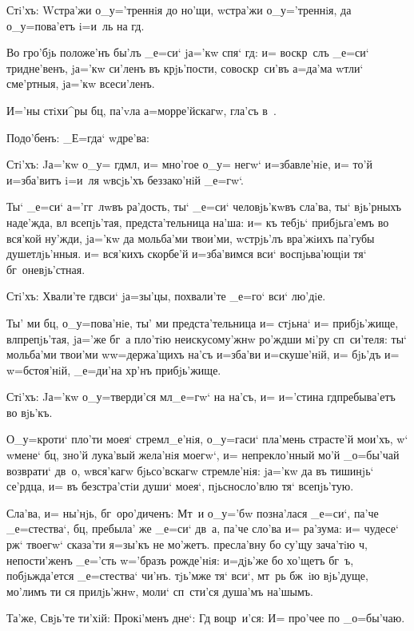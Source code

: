 Стi'хъ: W\т стра'жи о_у='треннiя до но'щи, w\т стра'жи 
о_у='треннiя, да о_у=пова'етъ i=и~ль на гд.

Во гро'бjь положе'нъ бы'лъ _е=си` jа='кw спя` гд: 
и= воскр~слъ _е=си` тридне'венъ, jа='кw си'ленъ въ 
крjь'пости, совоскр~си'въ а=да'ма w\т тли` сме'ртныя, 
jа='кw всеси'ленъ.

И='ны стiхи^ры бц, па'vла а=морре'йскагw, гла'съ 
в~.

Подо'бенъ: _Е=гда` w\т дре'ва:

Стi'хъ: Jа='кw о_у= гд мл, и= мно'гое о_у= 
негw` и=збавле'нiе, и= то'й и=зба'витъ i=и~ля w\т всjь'хъ 
беззако'нiй _е=гw`.

Ты` _е=си` а='гг~лwвъ ра'дость, ты` _е=си` 
человjь'кwвъ сла'ва, ты` вjь'рныхъ наде'жда, вл 
всепjь'тая, предста'тельница на'ша: и= къ тебjь` 
прибjьга'емъ во вся'кой ну'жди, jа='кw да мольба'ми 
твои'ми, w\т стрjь'лъ вра'жiихъ па'губы душетлjь'нныя. и= 
вся'кихъ скорбе'й и=зба'вимся вси` воспjьва'ющiи тя` 
бг~оневjь'стная.

Стi'хъ: Хвали'те гд вси` jа=зы'цы, похвали'те 
_е=го` вси` лю'дiе.

Ты' ми бц, о_у=пова'нiе, ты' ми предста'тельница и= 
стjьна` и= прибjь'жище, вл препjь'тая, jа='же бг~а 
пло'тiю неискусому'жнw ро'ждши мi'ру сп~си'теля: ты` 
мольба'ми твои'ми w\т w=держа'щихъ на'съ и=зба'ви 
и=скуше'нiй, и= бjь'дъ и= w=бстоя'нiй, _е=ди'на 
хр'нъ прибjь'жище.

Стi'хъ: Jа='кw о_у=тверди'ся мл _е=гw` на на'съ, 
и= и='стина гд пребыва'етъ во вjь'къ.

О_у=кроти` пло'ти моея` стремл_е'нiя, о_у=гаси` 
пла'мень страсте'й мои'хъ, w` w\т мене` бц, зно'й 
лука'вый жела'нiя моегw`, и= непрекло'нный мо'й _о=бы'чай 
возврати` дв~о, w\т вся'кагw бjьсо'вскагw стремле'нiя: 
jа='кw да въ тишинjь` се'рдца, и= въ безстра'стiи души` 
моея`, пjьсносло'влю тя` всепjь'тую.

Сла'ва, и= ны'нjь, бг~оро'диченъ: Мт~и о_у='бw 
позна'лася _е=си`, па'че _е=стества`, бц, пребыла' же 
_е=си` дв~а, па'че сло'ва и= ра'зума: и= чудесе` рж` 
твоегw` сказа'ти я=зы'къ не мо'жетъ. пресла'вну бо су'щу 
зача'тiю ч, непости'женъ _е='сть w='бразъ рожде'нiя: 
и=дjь'же бо хо'щетъ бг~ъ, побjьжда'ется _е=стества` 
чи'нъ. тjь'мже тя` вси`, мт~рь бж~iю вjь'дуще, мо'лимъ ти 
ся прилjь'жнw, моли` сп~сти'ся душа'мъ на'шымъ.

Та'же, Свjь'те ти'хiй: Прокi'менъ дне`: Гд 
воцр~и'ся: И= про'чее по _о=бы'чаю.

